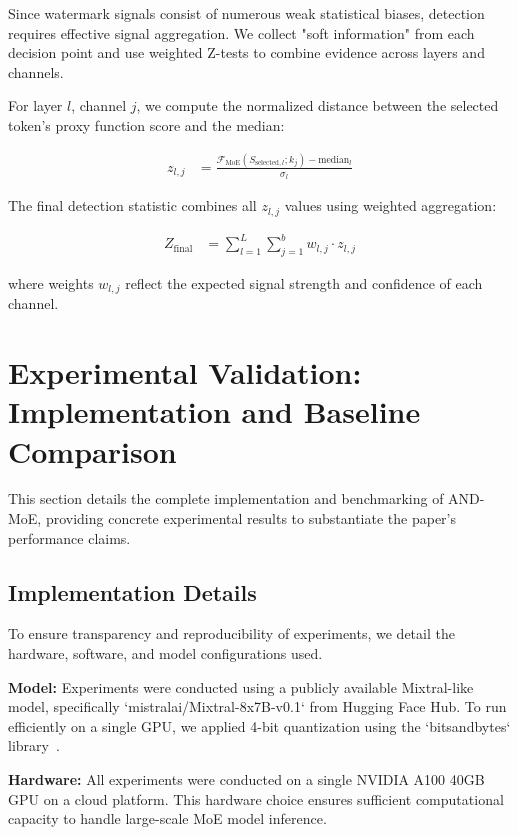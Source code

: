 \documentclass[letterpaper,twocolumn,10pt]{article}
\begin{document}
Since watermark signals consist of numerous weak statistical biases, detection requires effective signal aggregation. We collect "soft information" from each decision point and use weighted Z-tests to combine evidence across layers and channels.

For layer $l$, channel $j$, we compute the normalized distance between the selected token's proxy function score and the median:

\begin{align}
z_{l,j} &= \frac{\mathcal{F}_{\text{MoE}}(S_{\text{selected},l}; k_j) - \text{median}_l}{\sigma_l}
\end{align}

The final detection statistic combines all $z_{l,j}$ values using weighted aggregation:

\begin{align}
Z_{\text{final}} &= \sum_{l=1}^L \sum_{j=1}^b w_{l,j} \cdot z_{l,j}
\end{align}

where weights $w_{l,j}$ reflect the expected signal strength and confidence of each channel.

\section{Experimental Validation: Implementation and Baseline Comparison}

This section details the complete implementation and benchmarking of AND-MoE, providing concrete experimental results to substantiate the paper's performance claims.

\subsection{Implementation Details}

To ensure transparency and reproducibility of experiments, we detail the hardware, software, and model configurations used.

\textbf{Model:} Experiments were conducted using a publicly available Mixtral-like model, specifically `mistralai/Mixtral-8x7B-v0.1` from Hugging Face Hub. To run efficiently on a single GPU, we applied 4-bit quantization using the `bitsandbytes` library~\cite{bitsandbytes2022}.

\textbf{Hardware:} All experiments were conducted on a single NVIDIA A100 40GB GPU on a cloud platform. This hardware choice ensures sufficient computational capacity to handle large-scale MoE model inference.
\end{document}
